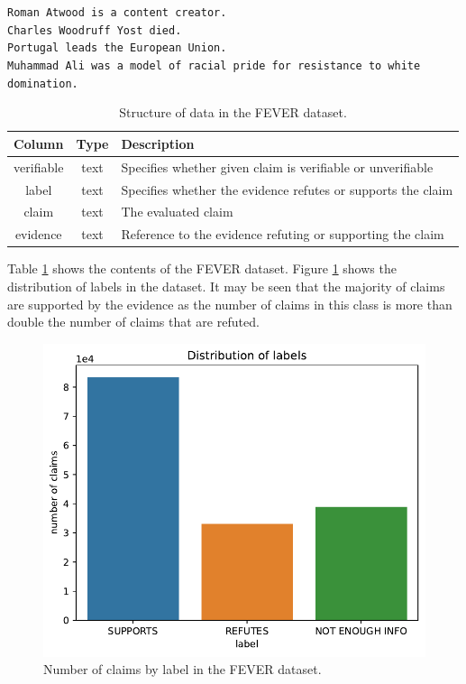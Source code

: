 \begin{center}
    \texttt{Roman Atwood is a content creator.} \\
    \texttt{Charles Woodruff Yost died.} \\
    \texttt{Portugal leads the European Union.} \\
    \texttt{Muhammad Ali was a model of racial pride for resistance to white domination.}
\end{center}

\begin{table}[H]
    \centering
    \begin{tabular}{c|c|l}
    \textbf{Column} & \cellcolor[HTML]{FFFFFF}\textbf{Type} & \cellcolor[HTML]{FFFFFF}\textbf{Description} \\ \hline
    verifiable & text & Specifies whether given claim is verifiable or unverifiable  \\
    label      & text & Specifies whether the evidence refutes or supports the claim \\
    claim      & text & The evaluated claim                                          \\
    evidence   & text & Reference to the evidence refuting or supporting the claim  
    \end{tabular}
    \caption{Structure of data in the FEVER dataset.}
    \label{tab:fever_columns}
\end{table}

Table \ref{tab:fever_columns} shows the contents of the FEVER dataset. Figure \ref{fig:fever_labels} shows the distribution of labels in the dataset. It may be seen that the majority of claims are supported by the evidence as the number of claims in this class is more than double the number of claims that are refuted. 

\begin{figure}[H]
    \centering
    \includegraphics[scale=0.6]{obrazky-figures/fever_labels.pdf}
    \caption{Number of claims by label in the FEVER dataset.}
    \label{fig:fever_labels}
\end{figure}

